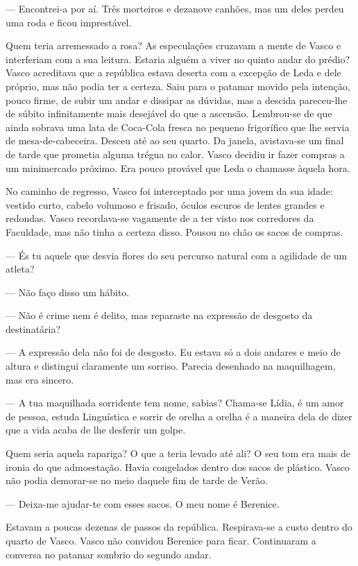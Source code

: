 --- Encontrei-a por aí. Três morteiros e dezanove canhões, mas um deles
  perdeu uma roda e ficou imprestável.

Quem teria arremessado a rosa? As especulações cruzavam a mente de
Vasco e interferiam com a sua leitura. Estaria alguém a viver no quinto
andar do prédio? Vasco acreditava que a república estava deserta com a
excepção de Leda e dele próprio, mas não podia ter a certeza. Saiu para
o patamar movido pela intenção, pouco firme, de subir um andar e
dissipar as dúvidas, mas a descida pareceu-lhe de súbito infinitamente
mais desejável do que a ascensão. Lembrou-se de que ainda sobrava uma
lata de Coca-Cola fresca no pequeno frigorífico que lhe servia de
mesa-de-cabeceira. Desceu até ao seu quarto. Da janela, avistava-se um
final de tarde que prometia alguma trégua no calor. Vasco decidiu ir
fazer compras a um minimercado próximo. Era pouco provável que Leda o
chamasse àquela hora.

No caminho de regresso, Vasco foi interceptado por uma jovem da sua
idade: vestido curto, cabelo volumoso e frisado, óculos escuros de
lentes grandes e redondas. Vasco recordava-se vagamente de a ter visto nos corredores da Faculdade, mas não tinha
a certeza disso. Pousou no chão os sacos de compras.

--- És tu aquele que desvia flores do seu percurso natural com a agilidade
  de um atleta?

--- Não faço disso um hábito.

--- Não é crime nem é delito, mas reparaste na expressão de desgosto da
  destinatária?

--- A expressão dela não foi de desgosto. Eu estava só a dois andares e
  meio de altura e distingui claramente um sorriso. Parecia desenhado
  na maquilhagem, mas era sincero.

--- A tua maquilhada sorridente tem nome, sabias? Chama-se Lídia, é um
  amor de pessoa, estuda Linguística e sorrir de orelha a orelha é a
  maneira dela de dizer que a vida acaba de lhe desferir um golpe.

Quem seria aquela rapariga? O que a teria levado até ali? O seu tom era
mais de ironia do que admoestação. Havia congelados dentro dos sacos de
plástico. Vasco não podia demorar-se no meio daquele fim de tarde de
Verão.

--- Deixa-me ajudar-te com esses sacos. O meu nome é Berenice.

Estavam a poucas dezenas de passos da república. Respirava-se a custo
dentro do quarto de Vasco. Vasco não convidou Berenice para ficar.
Continuaram a conversa no patamar sombrio do segundo andar.

